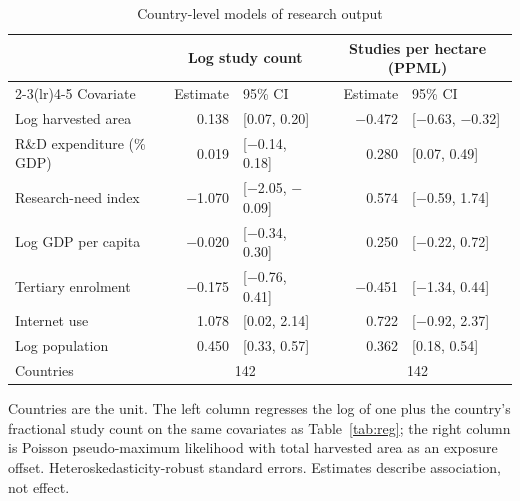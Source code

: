 \begin{table}[!t]
\centering
\footnotesize
\caption{Country-level models of research output}
\label{tab:countrylevel}
\begin{tabular*}{\textwidth}{@{\extracolsep\fill}l r@{\hspace{6pt}}l r@{\hspace{6pt}}l@{}}
\toprule
& \multicolumn{2}{c}{Log study count} & \multicolumn{2}{c}{Studies per hectare (PPML)} \\
\cmidrule(lr){2-3}\cmidrule(lr){4-5}
Covariate & Estimate & 95\% CI & Estimate & 95\% CI \\
\midrule
Log harvested area & 0.138 & [0.07, 0.20] & $-$0.472 & [$-$0.63, $-$0.32] \\
R\&D expenditure (\% GDP) & 0.019 & [$-$0.14, 0.18] & 0.280 & [0.07, 0.49] \\
Research-need index & $-$1.070 & [$-$2.05, $-$0.09] & 0.574 & [$-$0.59, 1.74] \\
Log GDP per capita & $-$0.020 & [$-$0.34, 0.30] & 0.250 & [$-$0.22, 0.72] \\
Tertiary enrolment & $-$0.175 & [$-$0.76, 0.41] & $-$0.451 & [$-$1.34, 0.44] \\
Internet use & 1.078 & [0.02, 2.14] & 0.722 & [$-$0.92, 2.37] \\
Log population & 0.450 & [0.33, 0.57] & 0.362 & [0.18, 0.54] \\
\midrule
Countries & \multicolumn{2}{c}{142} & \multicolumn{2}{c}{142} \\
\bottomrule
\end{tabular*}
\begin{tablenotes}
\item[] Countries are the unit. The left column regresses the log of one plus the country's fractional study count on the same covariates as Table~\ref{tab:reg}; the right column is Poisson pseudo-maximum likelihood with total harvested area as an exposure offset. Heteroskedasticity-robust standard errors. Estimates describe association, not effect.
\end{tablenotes}
\end{table}
